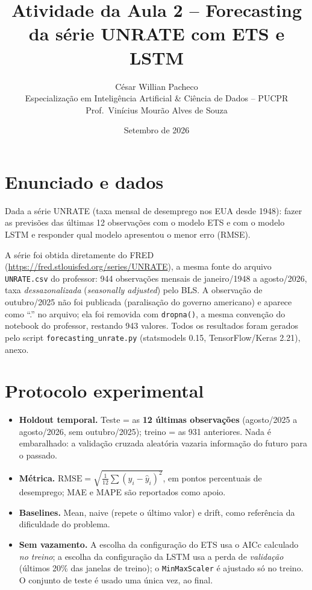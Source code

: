 \documentclass[11pt,a4paper]{article}
\title{\bfseries Atividade da Aula 2 -- Forecasting da série UNRATE com ETS e LSTM}
\author{César Willian Pacheco\\ \small Especialização em Inteligência Artificial \& Ciência de Dados -- PUCPR\\ \small Prof.\ Vinícius Mourão Alves de Souza}
\date{Setembro de 2026}
\begin{document}
\maketitle
\thispagestyle{fancy}

\section*{Enunciado e dados}
Dada a série UNRATE (taxa mensal de desemprego nos EUA desde 1948): fazer as previsões das últimas 12 observações com o modelo ETS e com o modelo LSTM e responder qual modelo apresentou o menor erro (RMSE).

A série foi obtida diretamente do FRED (\url{https://fred.stlouisfed.org/series/UNRATE}), a mesma fonte do arquivo \texttt{UNRATE.csv} do professor: 944 observações mensais de janeiro/1948 a agosto/2026, taxa \emph{dessazonalizada} (\textit{seasonally adjusted}) pelo BLS. A observação de outubro/2025 não foi publicada (paralisação do governo americano) e aparece como ``.'' no arquivo; ela foi removida com \texttt{dropna()}, a mesma convenção do notebook do professor, restando 943 valores. Todos os resultados foram gerados pelo script \texttt{forecasting\_unrate.py} (statsmodels 0.15, TensorFlow/Keras 2.21), anexo.

\section{Protocolo experimental}
\begin{itemize}[leftmargin=*]
\item \textbf{Holdout temporal.} Teste = as \textbf{12 últimas observações} (agosto/2025 a agosto/2026, sem outubro/2025); treino = as 931 anteriores. Nada é embaralhado: a validação cruzada aleatória vazaria informação do futuro para o passado.
\item \textbf{Métrica.} $\text{RMSE} = \sqrt{\tfrac{1}{12}\sum (y_i - \hat y_i)^2}$, em pontos percentuais de desemprego; MAE e MAPE são reportados como apoio.
\item \textbf{Baselines.} Mean, naive (repete o último valor) e drift, como referência da dificuldade do problema.
\item \textbf{Sem vazamento.} A escolha da configuração do ETS usa o AICc calculado \emph{no treino}; a escolha da configuração da LSTM usa a perda de \emph{validação} (últimos 20\% das janelas de treino); o \texttt{MinMaxScaler} é ajustado só no treino. O conjunto de teste é usado uma única vez, ao final.
\end{itemize}
\end{document}
